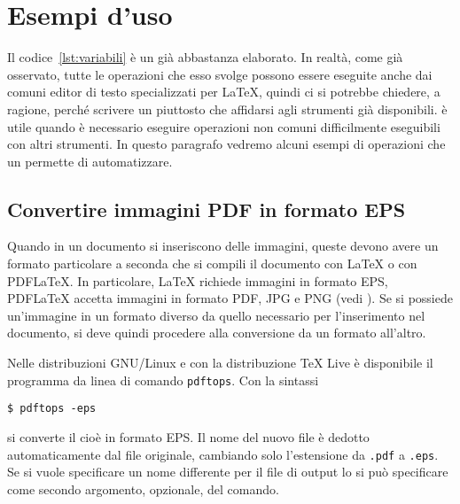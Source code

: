 \cleardoublepage{}
\chapter{Esempi d'uso}
\label{cha:esempi}

Il codice~\ref{lst:variabili} è un  già abbastanza
elaborato.  In realtà, come già osservato, tutte le operazioni che esso svolge
possono essere eseguite anche dai comuni editor di testo specializzati per
\LaTeX{}, quindi ci si potrebbe chiedere, a ragione, perché scrivere un
 piuttosto che affidarsi agli strumenti già disponibili.
 è utile quando è necessario eseguire operazioni non comuni
difficilmente eseguibili con altri strumenti.  In questo paragrafo vedremo
alcuni esempi di operazioni che un  permette di
automatizzare.

\section{Convertire immagini \textsc{PDF} in formato \textsc{EPS}}
\label{sec:immagini-eps}

Quando in un documento si inseriscono delle immagini, queste devono avere un
formato particolare a seconda che si compili il documento con \LaTeX{}
o con \textsc{PDF}\LaTeX.  In particolare, \LaTeX{}
richiede immagini in formato \textsc{EPS}, \textsc{PDF}\LaTeX{}
accetta immagini in formato \textsc{PDF}, \textsc{JPG} e \textsc{PNG} (vedi
\cite[pagina 105]{pantieri:latex}).  Se si possiede un'immagine in un formato
diverso da quello necessario per l'inserimento nel documento, si deve quindi
procedere alla conversione da un formato all'altro.

Nelle distribuzioni GNU/Linux e con la distribuzione TeX Live è disponibile il
programma da linea di comando \texttt{pdftops}. Con la sintassi
\begin{sintassi}
  \small \texttt{\$ pdftops -eps}  
\end{sintassi}
si converte il cioè  in formato \textsc{EPS}.  Il nome del nuovo
file è dedotto automaticamente dal file originale, cambiando solo l'estensione
da \texttt{.pdf} a \texttt{.eps}.  Se si vuole specificare un nome differente
per il file di output lo si può specificare come secondo argomento, opzionale,
del comando.

